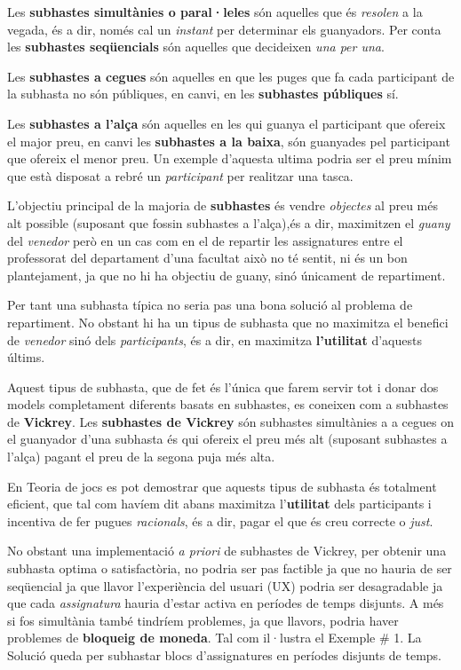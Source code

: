 \documentclass[10pt,twocolumn]{article}
\begin{document}
Les \textbf{subhastes simultànies o paral·leles} són aquelles que és \textit{resolen} a la vegada, és a dir, només cal un \textit{instant} per determinar els guanyadors. Per conta les \textbf{subhastes seqüencials } són aquelles que decideixen \textit{una per una}. 

Les \textbf{subhastes a cegues} són aquelles en que les puges que fa cada participant de la subhasta no són públiques, en canvi, en les \textbf{subhastes públiques} sí.

Les \textbf{subhastes a l'alça} són aquelles en les qui guanya el participant que ofereix el major preu, en canvi les \textbf{subhastes a la baixa}, són guanyades pel participant que  ofereix el menor preu. Un exemple d'aquesta ultima podria ser el preu mínim que està disposat a rebré un \textit{participant} per realitzar una tasca.

L'objectiu principal de la majoria de \textbf{subhastes} és vendre \textit{objectes} al preu més alt possible (suposant que fossin subhastes a l'alça),és a dir, maximitzen el \textit{guany} del \textit{venedor} però en un cas com en el de repartir les assignatures entre el professorat del departament d'una facultat això no té sentit, ni és un bon plantejament, ja que no hi ha objectiu de guany, sinó únicament de repartiment.

Per tant una subhasta típica no seria pas una bona solució al problema de repartiment. No obstant hi ha un tipus de subhasta que no maximitza el benefici de \textit{venedor} sinó dels \textit{participants}, és a dir, en maximitza \textbf{l'utilitat} d'aquests últims. 

Aquest tipus de subhasta, que de fet és l'única que farem servir tot i donar dos models completament diferents basats en subhastes, es coneixen com a subhastes de \textbf{Vickrey}. Les \textbf{subhastes de Vickrey} són subhastes  simultànies a a cegues on el guanyador d'una subhasta és qui ofereix el preu més alt (suposant subhastes a l'alça) pagant el preu de la segona puja més alta.

En Teoria de jocs es pot demostrar que aquests tipus de subhasta és totalment eficient, que tal com havíem dit abans maximitza l'\textbf{utilitat} dels participants i incentiva de fer pugues \textit{racionals}, és a dir, pagar el que és creu correcte o \textit{just}.   

No obstant una implementació \textit{a priori} de subhastes de Vickrey, per obtenir una subhasta optima o satisfactòria, no podria ser pas factible  ja que no hauria de ser seqüencial ja que llavor l'experiència del usuari (UX) podria ser desagradable ja que cada \textit{assignatura} hauria d'estar activa en períodes de temps disjunts. A més si fos simultània també tindríem problemes, ja que llavors, podria haver problemes de \textbf{bloqueig de moneda}. Tal com il·lustra el Exemple \# 1. La Solució queda per subhastar blocs d'assignatures en períodes disjunts de temps.
\end{document}
